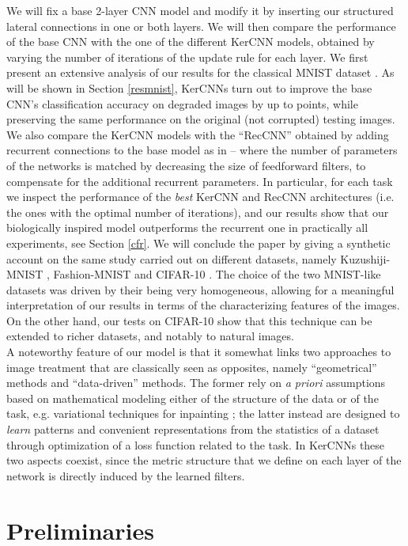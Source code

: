 \documentclass[11pt,oneside,reqno]{amsart}
\begin{document}
  We will fix a base 2-layer CNN model and modify it by inserting our structured lateral connections in one or both layers. We will then compare the performance of the base CNN with the one of the different KerCNN models, obtained by varying the number of iterations of the update rule for each layer. We first present an extensive analysis of our results for the classical MNIST dataset \citep{mnist}. As will be shown in Section \ref{resmnist}, KerCNNs turn out to improve the base CNN's classification accuracy on degraded images by up to  points, while preserving the same performance on the original (not corrupted) testing images. We also compare the KerCNN models with the ``RecCNN'' obtained by adding recurrent connections to the base model as in \citet{spoerer} -- where the number of parameters of the networks is matched by decreasing the size of feedforward filters, to compensate for the additional recurrent parameters. In particular, for each task we inspect the performance of the \emph{best} KerCNN and RecCNN architectures (i.e. the ones with the optimal number of iterations), and our results show that our biologically inspired model outperforms the recurrent one in practically all experiments, see Section \ref{cfr}. We will conclude the paper by giving a synthetic account on the same study carried out on different datasets, namely Kuzushiji-MNIST \citep{kmnist}, Fashion-MNIST \citep{fashion} and CIFAR-10 \citep{cifar}. The choice of the two MNIST-like datasets was driven by their being very homogeneous, allowing for a meaningful interpretation of our results in terms of the characterizing features of the images. On the other hand, our tests on CIFAR-10 show that this technique can be extended to richer datasets, and notably to natural images.\\
  A noteworthy feature of our model is that it somewhat links two approaches to image treatment that are classically seen as opposites, namely ``geometrical'' methods and ``data-driven'' methods. The former rely on \emph{a priori} assumptions based on mathematical modeling either of the structure of the data or of the task, e.g. variational techniques for inpainting \citep{ambmasn,inpainting}; the latter instead are designed to \emph{learn} patterns and convenient representations from the statistics of a dataset through optimization of a loss function related to the task. In KerCNNs these two aspects coexist, since the metric structure that we define on each layer of the network is directly induced by the learned filters.
 
 
 \section{Preliminaries}
 
\end{document}
